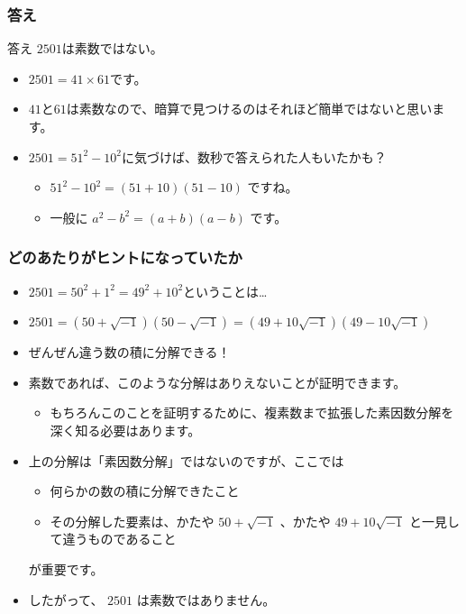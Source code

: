 \documentclass[dvipdfmx]{beamer}
\begin{document}
  \begin{frame}
    \frametitle{答え}

    \begin{block}{答え}
      $2501$は素数ではない。
    \end{block}
    \begin{itemize}
      \item $2501 = 41 \times 61$です。
      \item $41$と$61$は素数なので、暗算で見つけるのはそれほど簡単ではないと思います。
      \item $2501 = 51^2 - 10^2$に気づけば、数秒で答えられた人もいたかも？
      \begin{itemize}
        \item $51^2 - 10^2 = (51+10)(51-10)$ ですね。
        \item 一般に $a^2 - b^2 = (a+b)(a-b)$ です。
      \end{itemize}
    \end{itemize}

  \end{frame}

  \begin{frame}
    \frametitle{どのあたりがヒントになっていたか}

    \begin{itemize}
      \item $2501 = 50^2 + 1^2 = 49^2 + 10^2$ということは…
      \item $2501 = (50+\sqrt{-1})(50-\sqrt{-1}) = (49+10\sqrt{-1})(49-10\sqrt{-1})$
      \item ぜんぜん違う数の積に分解できる！
      \item 素数であれば、このような分解はありえないことが証明できます。
      \begin{itemize}
        \item もちろんこのことを証明するために、複素数まで拡張した素因数分解を深く知る必要はあります。
      \end{itemize}
      \item 上の分解は「素因数分解」ではないのですが、ここでは
      \begin{itemize}
        \item 何らかの数の積に分解できたこと
        \item その分解した要素は、かたや $50+\sqrt{-1}$ 、かたや $49+10\sqrt{-1}$ と一見して違うものであること
      \end{itemize}
      が重要です。
      \item したがって、 $2501$ は素数ではありません。
    \end{itemize}

  \end{frame}
\end{document}
